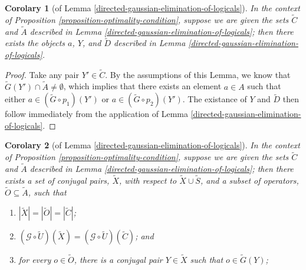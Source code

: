 \documentclass[twocolumn,showpacs,preprintnumbers,amsmath,amssymb,nofootinbib,pra,floatfix]{revtex4-1}
\newtheorem{corolary}{Corolary}
\newcommand{\set}{\tilde}
\newcommand{\genfun}{\mathcal{G}}
\begin{document}
\begin{corolary}[of Lemma \ref{directed-gaussian-elimination-of-logicals}]
\label{undirected-gaussian-elimination-of-logicals}
In the context of Proposition \ref{proposition-optimality-condition}, suppose we are given the sets $\set C$ and $\set A$ described in Lemma \ref{directed-gaussian-elimination-of-logicals};  then there exists the objects $a$, $Y$, and $\set D$ described in Lemma \ref{directed-gaussian-elimination-of-logicals}.
\end{corolary}

\begin{proof}
Take any pair $Y'\in\set C$.  By the assumptions of this Lemma, we know that $\set G(Y')\cap \set A \ne \emptyset$, which implies that there exists an element $a\in A$ such that either $a\in (\set G\circ p_1)(Y')$ or $a\in (\set G\circ p_2)(Y')$.  The existance of $Y$ and $\set D$ then follow immediately from the application of Lemma \ref{directed-gaussian-elimination-of-logicals}.
\end{proof}
\begin{corolary}[of Lemma \ref{directed-gaussian-elimination-of-logicals}]
\label{elimination-to-create-subset}
In the context of Proposition \ref{proposition-optimality-condition}, suppose we are given the sets $\set C$ and $\set A$ described in Lemma \ref{directed-gaussian-elimination-of-logicals};  then there exists a set of conjugal pairs, $\set X$, with respect to $\set X\cup\set S$, and a subset of operators, $\set O\subseteq \set A$, such that
\begin{enumerate}
\item $|\set X|=|\set O|=|\set C|$;
\item $(\genfun\circ\set U)(\set X)=(\genfun\circ\set U)(\set C)$; and
\item for every $o\in\set O$, there is a conjugal pair $Y\in\set X$ such that $o\in\set G(Y)$;
\end{enumerate}
\end{corolary}
\end{document}
